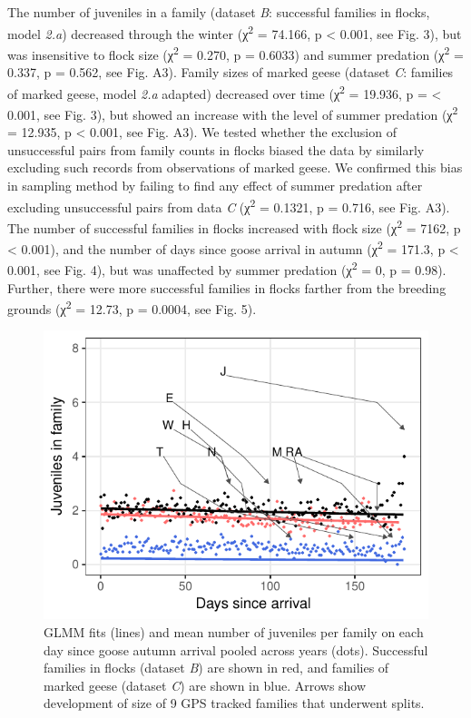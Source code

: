 \documentclass[10pt,twocolumn]{paper}
\begin{document}
The number of juveniles in a family (dataset \emph{B}: successful
families in flocks, model \emph{2.a}) decreased through the winter
(χ\textsuperscript{2} = 74.166, p \textless{} 0.001, see Fig. 3), but
was insensitive to flock size (χ\textsuperscript{2} = 0.270, p = 0.6033)
and summer predation (χ\textsuperscript{2} = 0.337, p = 0.562, see Fig.
A3). Family sizes of marked geese (dataset \emph{C}: families of marked
geese, model \emph{2.a} adapted) decreased over time
(χ\textsuperscript{2} = 19.936, p = \textless{} 0.001, see Fig. 3), but
showed an increase with the level of summer predation
(χ\textsuperscript{2} = 12.935, p \textless{} 0.001, see Fig. A3). We
tested whether the exclusion of unsuccessful pairs from family counts in
flocks biased the data by similarly excluding such records from
observations of marked geese. We confirmed this bias in sampling method
by failing to find any effect of summer predation after excluding
unsuccessful pairs from data \emph{C} (χ\textsuperscript{2} = 0.1321, p
= 0.716, see Fig. A3). The number of successful families in flocks
increased with flock size (χ\textsuperscript{2} = 7162, p \textless{}
0.001), and the number of days since goose arrival in autumn
(χ\textsuperscript{2} = 171.3, p \textless{} 0.001, see Fig. 4), but was
unaffected by summer predation (χ\textsuperscript{2} = 0, p = 0.98).
Further, there were more successful families in flocks farther from the
breeding grounds (χ\textsuperscript{2} = 12.73, p = 0.0004, see Fig. 5).

\begin{figure}
\includegraphics[width = 1\linewidth]{fam_time.pdf}
\caption{{\small GLMM fits (lines) and mean number of juveniles per family on each day since goose autumn arrival pooled across years (dots). Successful families in flocks (dataset \emph{B}) are shown in red, and families of marked geese (dataset \emph{C}) are shown in blue. Arrows show development of size of 9 GPS tracked families that underwent splits.}}
\end{figure}
\end{document}
